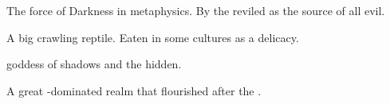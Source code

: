 \documentclass
  [a4paper,
   12pt,
   oneside
  ]%
  {article}
\begin{document}
\begin{gloss}
\begin{comment}
\subsection{\itzach}
\end{comment}
\gitem{\Itzach}
The force of Darkness in  metaphysics. 
By the  reviled as the source of all evil. 



\begin{comment}
\paragraph{mosca}
\end{comment}
A big crawling reptile. 
Eaten in some cultures as a delicacy.



\begin{comment}
\paragraph{Nasshikerr}
\end{comment}
\gitem{\Nasshikerr}
\Ortaican goddess of shadows and the hidden.



\begin{comment}
\paragraph{\Ortaica}
\end{comment}
\gitem{\Ortaica}
A great -dominated realm that flourished after the . 






\begin{comment}

\end{comment}
\end{gloss}
\end{document}
